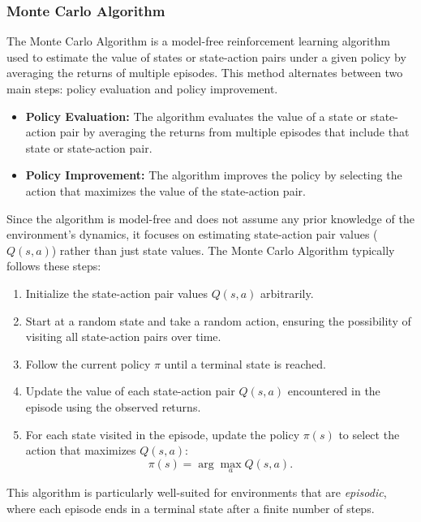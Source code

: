 \subsubsection{\textbf{Monte Carlo Algorithm}}
The Monte Carlo Algorithm is a model-free reinforcement learning algorithm used 
to estimate the value of states or state-action pairs under a given policy by averaging
 the returns of multiple episodes. This method alternates between two main steps: policy
  evaluation and policy improvement.

\begin{itemize}
    \item \textbf{Policy Evaluation:} The algorithm evaluates the value of a state or state-action pair by averaging the returns from multiple episodes that include that state or state-action pair.
    \item \textbf{Policy Improvement:} The algorithm improves the policy by selecting the action that maximizes the value of the state-action pair.
\end{itemize}

Since the algorithm is model-free and does not assume any prior knowledge of
the environment's dynamics, it focuses on estimating state-action pair values
(\( Q(s, a) \)) rather than just state values. The Monte Carlo Algorithm
typically follows these steps:

\begin{enumerate}
    \item Initialize the state-action pair values \( Q(s, a) \) arbitrarily.
    \item Start at a random state and take a random action, ensuring the possibility of
          visiting all state-action pairs over time.
    \item Follow the current policy \( \pi \) until a terminal state is reached.
    \item Update the value of each state-action pair \( Q(s, a) \) encountered in the
          episode using the observed returns.
    \item For each state visited in the episode, update the policy \( \pi(s) \) to select
          the action that maximizes \( Q(s, a) \):
          \[
              \pi(s) = \arg\max_a Q(s, a).
          \]
\end{enumerate}

This algorithm is particularly well-suited for environments that are
\emph{episodic}, where each episode ends in a terminal state after a finite
number of steps.

